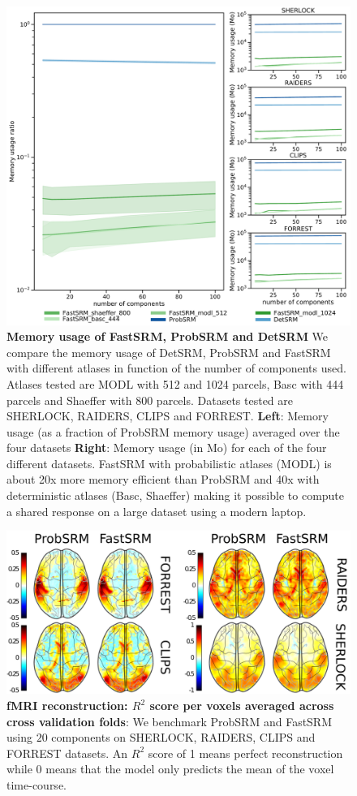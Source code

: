 \documentclass{report}
\begin{document}
{\begin{figure}
\centering
\includegraphics[scale=0.33]{figures/srm/memory_usage.pdf}
\caption{\textbf{Memory usage of FastSRM, ProbSRM and DetSRM} We compare the memory usage of DetSRM, ProbSRM and FastSRM with different atlases in function of the number of components used. Atlases tested are MODL with 512 and 1024 parcels, Basc with 444 parcels and Shaeffer with 800 parcels. Datasets tested are SHERLOCK, RAIDERS, CLIPS and FORREST.
\textbf{Left}: Memory usage (as a fraction of ProbSRM memory usage) averaged over the four datasets
\textbf{Right}: Memory usage (in Mo) for each of the four different datasets.
FastSRM with probabilistic atlases (MODL) is about 20x more memory efficient than ProbSRM and 40x with deterministic atlases (Basc, Shaeffer) making it possible to compute a shared response on a large dataset using a modern laptop.}
\label{fig:memory_usage}
\end{figure}


\begin{figure}
\centering
\includegraphics[scale=0.43]{figures/srm/mean_r2_reconstruction.png}
\caption{\textbf{fMRI reconstruction: $R^2$ score per voxels averaged across cross validation folds}: We benchmark ProbSRM and FastSRM using $20$ components on SHERLOCK, RAIDERS, CLIPS and FORREST datasets. An $R^2$ score of 1 means perfect reconstruction while 0 means that the model only predicts the mean of the voxel time-course.}
\label{fig:example_r2}
\end{figure}


}
\end{document}
